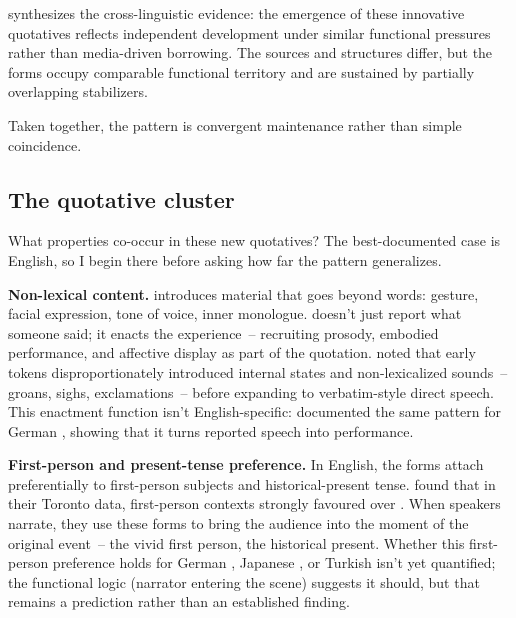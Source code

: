 \textcite{buchstaller2014} synthesizes the cross-linguistic evidence: the emergence of these innovative quotatives reflects independent development under similar functional pressures rather than media-driven borrowing. The sources and structures differ, but the forms occupy comparable functional territory and are sustained by partially overlapping stabilizers.

Taken together, the pattern is convergent maintenance rather than simple coincidence.

\subsection{The quotative cluster}
\label{sec:6:quotative-cluster}

What properties co-occur in these new quotatives? The best-documented case is English, so I begin there before asking how far the pattern generalizes.

\textbf{Non-lexical content.}  introduces material that goes beyond words: gesture, facial expression, tone of voice, inner monologue.  doesn't just report what someone said; it enacts the experience~-- recruiting prosody, embodied performance, and affective display as part of the quotation. \textcite{ferrarabell1995} noted that early  tokens disproportionately introduced internal states and non-lexicalized sounds~-- groans, sighs, exclamations~-- before expanding to verbatim-style direct speech. This enactment function isn't English-specific: \textcite{golato2000} documented the same pattern for German , showing that it turns reported speech into performance.

\textbf{First-person and present-tense preference.} In English, the forms attach preferentially to first-person subjects and historical-present tense. \textcite{tagliamontedarcy2004} found that in their Toronto data, first-person contexts strongly favoured  over . When speakers narrate, they use these forms to bring the audience into the moment of the original event~-- the vivid first person, the historical present. Whether this first-person preference holds for German , Japanese , or Turkish  isn't yet quantified; the functional logic (narrator entering the scene) suggests it should, but that remains a prediction rather than an established finding.

